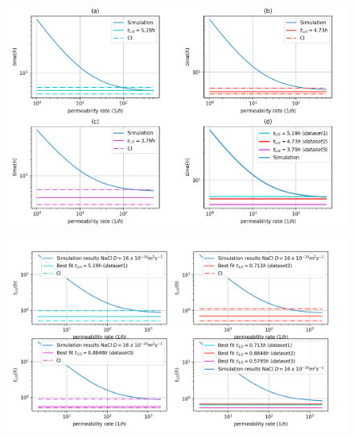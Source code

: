\documentclass[11ptm,oneside,a4paper]{report}
\begin{document}
\begin{figure}[!htb]
  \begin{center}
      \includegraphics[scale=0.25]{figures/PEG1000_CI.png}
      \caption{\label{fig_PEG100_CI}}  
  \end{center} 
\end{figure}



\begin{figure}[!htb]
  \begin{center}
      \includegraphics[scale=0.25]{figures/SALT_CI.png}
      \caption{\label{fig_NACL_CI}}
  \end{center} 
\end{figure}


\end{document}
